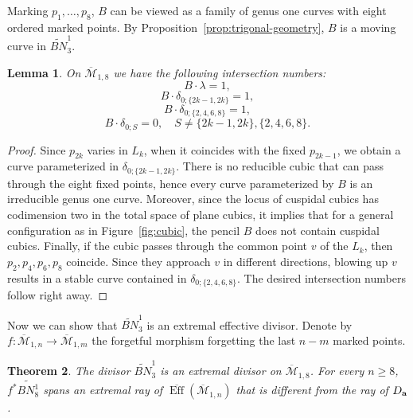 \documentclass[11]{amsart}
\theoremstyle{plain}
\newtheorem{theorem}{Theorem}[section]
\newtheorem{lemma}[theorem]{Lemma}
\theoremstyle{definition}
\newcommand{\BM}{\overline{\mathcal M}}
\newcommand{\BEff}{\overline{\operatorname{Eff}}}
\newcommand{\wt}{\widetilde}
\begin{document}
Marking $p_1,\ldots, p_8$, $B$ can be viewed as a family of genus one curves with eight ordered marked points. By Proposition~\ref{prop:trigonal-geometry}, $B$ is a moving curve in $\wt{BN}^1_3$.  

\begin{lemma}
\label{lem:trigonal-intersection}
On $\BM_{1,8}$ we have the following intersection numbers: 
$$ B\cdot \lambda = 1, $$
$$ B\cdot \delta_{0; \{2k-1, 2k \}} = 1, $$
$$ B\cdot \delta_{0; \{2,4,6,8\}} = 1, $$
$$ B\cdot \delta_{0; S} = 0, \quad S\neq \{ 2k-1, 2k \}, \{2,4,6,8\}. $$
\end{lemma}

\begin{proof}
Since $p_{2k}$ varies in $L_k$, when it coincides with the fixed $p_{2k-1}$, we obtain a curve parameterized in $\delta_{0; \{2k-1, 2k \}}$. There is no reducible cubic that can pass through the eight fixed points, hence every curve parameterized by $B$ is an irreducible genus one curve. Moreover, since the locus of cuspidal cubics has codimension two in the total space of plane cubics, it implies that for a general configuration as in Figure~\ref{fig:cubic}, the pencil $B$ does not contain cuspidal cubics. 
Finally, if the cubic passes through the common point $v$ of the $L_k$, then $p_2, p_4, p_6, p_8$ coincide. Since they approach $v$ in different directions,  
blowing up $v$ results in a stable curve contained in $\delta_{0; \{2,4,6,8\}}$. The desired intersection numbers follow right away. 
\end{proof}

Now we can show that $\wt{BN}^1_3$ is an extremal effective divisor. Denote by $f: \BM_{1, n} \to \BM_{1, m}$ the forgetful morphism forgetting the last $n-m$ marked points.

\begin{theorem}
\label{thm:trigonal-extremal}
The divisor $\wt{BN}^1_3$ is an extremal divisor on $\BM_{1,8}$. For every $n\geq 8$, $f^{*}\wt{BN^1_8}$ spans an extremal ray of 
$\BEff(\BM_{1,n})$ that is different from the ray of $D_{\bf a}$. 
\end{theorem}
\end{document}
